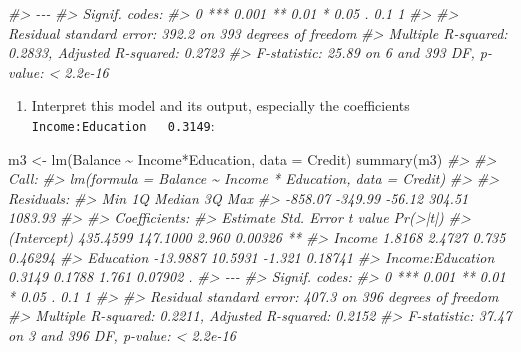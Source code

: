 \documentclass[
]{book}
\newenvironment{Shaded}{\begin{snugshade}}{\end{snugshade}}
\newcommand{\AttributeTok}[1]{\textcolor[rgb]{0.77,0.63,0.00}{#1}}
\newcommand{\CommentTok}[1]{\textcolor[rgb]{0.56,0.35,0.01}{\textit{#1}}}
\newcommand{\FunctionTok}[1]{\textcolor[rgb]{0.00,0.00,0.00}{#1}}
\newcommand{\NormalTok}[1]{#1}
\newcommand{\OtherTok}[1]{\textcolor[rgb]{0.56,0.35,0.01}{#1}}
\newcommand{\SpecialCharTok}[1]{\textcolor[rgb]{0.00,0.00,0.00}{#1}}
\providecommand{\tightlist}{%
  \setlength{\itemsep}{0pt}\setlength{\parskip}{0pt}}
\begin{document}
\begin{Shaded}
\begin{Highlighting}[]
\CommentTok{\#\textgreater{} {-}{-}{-}}
\CommentTok{\#\textgreater{} Signif. codes:  }
\CommentTok{\#\textgreater{} 0 \textquotesingle{}***\textquotesingle{} 0.001 \textquotesingle{}**\textquotesingle{} 0.01 \textquotesingle{}*\textquotesingle{} 0.05 \textquotesingle{}.\textquotesingle{} 0.1 \textquotesingle{} \textquotesingle{} 1}
\CommentTok{\#\textgreater{} }
\CommentTok{\#\textgreater{} Residual standard error: 392.2 on 393 degrees of freedom}
\CommentTok{\#\textgreater{} Multiple R{-}squared:  0.2833, Adjusted R{-}squared:  0.2723 }
\CommentTok{\#\textgreater{} F{-}statistic: 25.89 on 6 and 393 DF,  p{-}value: \textless{} 2.2e{-}16}
\end{Highlighting}
\end{Shaded}

\begin{enumerate}
\def\labelenumi{\arabic{enumi}.}
\setcounter{enumi}{5}
\tightlist
\item
  Interpret this model and its output, especially the coefficients \texttt{Income:Education\ \ \ 0.3149}:
\end{enumerate}

\begin{Shaded}
\begin{Highlighting}[]
\NormalTok{m3 }\OtherTok{\textless{}{-}} \FunctionTok{lm}\NormalTok{(Balance }\SpecialCharTok{\textasciitilde{}}\NormalTok{ Income}\SpecialCharTok{*}\NormalTok{Education, }\AttributeTok{data =}\NormalTok{ Credit)}
\FunctionTok{summary}\NormalTok{(m3)}
\CommentTok{\#\textgreater{} }
\CommentTok{\#\textgreater{} Call:}
\CommentTok{\#\textgreater{} lm(formula = Balance \textasciitilde{} Income * Education, data = Credit)}
\CommentTok{\#\textgreater{} }
\CommentTok{\#\textgreater{} Residuals:}
\CommentTok{\#\textgreater{}     Min      1Q  Median      3Q     Max }
\CommentTok{\#\textgreater{} {-}858.07 {-}349.99  {-}56.12  304.51 1083.93 }
\CommentTok{\#\textgreater{} }
\CommentTok{\#\textgreater{} Coefficients:}
\CommentTok{\#\textgreater{}                  Estimate Std. Error t value Pr(\textgreater{}|t|)   }
\CommentTok{\#\textgreater{} (Intercept)      435.4599   147.1000   2.960  0.00326 **}
\CommentTok{\#\textgreater{} Income             1.8168     2.4727   0.735  0.46294   }
\CommentTok{\#\textgreater{} Education        {-}13.9887    10.5931  {-}1.321  0.18741   }
\CommentTok{\#\textgreater{} Income:Education   0.3149     0.1788   1.761  0.07902 . }
\CommentTok{\#\textgreater{} {-}{-}{-}}
\CommentTok{\#\textgreater{} Signif. codes:  }
\CommentTok{\#\textgreater{} 0 \textquotesingle{}***\textquotesingle{} 0.001 \textquotesingle{}**\textquotesingle{} 0.01 \textquotesingle{}*\textquotesingle{} 0.05 \textquotesingle{}.\textquotesingle{} 0.1 \textquotesingle{} \textquotesingle{} 1}
\CommentTok{\#\textgreater{} }
\CommentTok{\#\textgreater{} Residual standard error: 407.3 on 396 degrees of freedom}
\CommentTok{\#\textgreater{} Multiple R{-}squared:  0.2211, Adjusted R{-}squared:  0.2152 }
\CommentTok{\#\textgreater{} F{-}statistic: 37.47 on 3 and 396 DF,  p{-}value: \textless{} 2.2e{-}16}
\end{Highlighting}
\end{Shaded}


  
\end{document}
